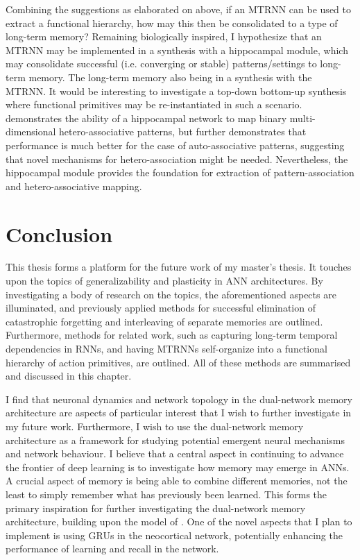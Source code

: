Combining the suggestions as elaborated on above, if an MTRNN can be used to extract a functional hierarchy, how may this then be consolidated to a type of long-term memory? Remaining biologically inspired, I hypothesize that an MTRNN may be implemented in a synthesis with a hippocampal module, which may consolidate successful (i.e. converging or stable) patterns/settings to long-term memory. The long-term memory also being in a synthesis with the MTRNN. It would be interesting to investigate a top-down bottom-up synthesis where functional primitives may be re-instantiated in such a scenario.
\cite{Hattori2014} demonstrates the ability of a hippocampal network to map binary multi-dimensional hetero-associative patterns, but further demonstrates that performance is much better for the case of auto-associative patterns, suggesting that novel mechanisms for hetero-association might be needed. Nevertheless, the hippocampal module provides the foundation for extraction of pattern-association and hetero-associative mapping.


\section{Conclusion}

This thesis forms a platform for the future work of my master's thesis. It touches upon the topics of generalizability and plasticity in ANN architectures. By investigating a body of research on the topics, the aforementioned aspects are illuminated, and previously applied methods for successful elimination of catastrophic forgetting and interleaving of separate memories are outlined. Furthermore, methods for related work, such as capturing long-term temporal dependencies in RNNs, and having MTRNNs self-organize into a functional hierarchy of action primitives, are outlined.
All of these methods are summarised and discussed in this chapter.

I find that neuronal dynamics and network topology in the dual-network memory architecture are aspects of particular interest that I wish to further investigate in my future work. 
Furthermore, I wish to use the dual-network memory architecture as a framework for studying potential emergent neural mechanisms and network behaviour.
I believe that a central aspect in continuing to advance the frontier of deep learning is to investigate how memory may emerge in ANNs. 
A crucial aspect of memory is being able to combine different memories, not the least to simply remember what has previously been learned. This forms the primary inspiration for further investigating the dual-network memory architecture, building upon the model of \cite{Hattori2014}. One of the novel aspects that I plan to implement is using GRUs in the neocortical network, potentially enhancing the performance of learning and recall in the network.

